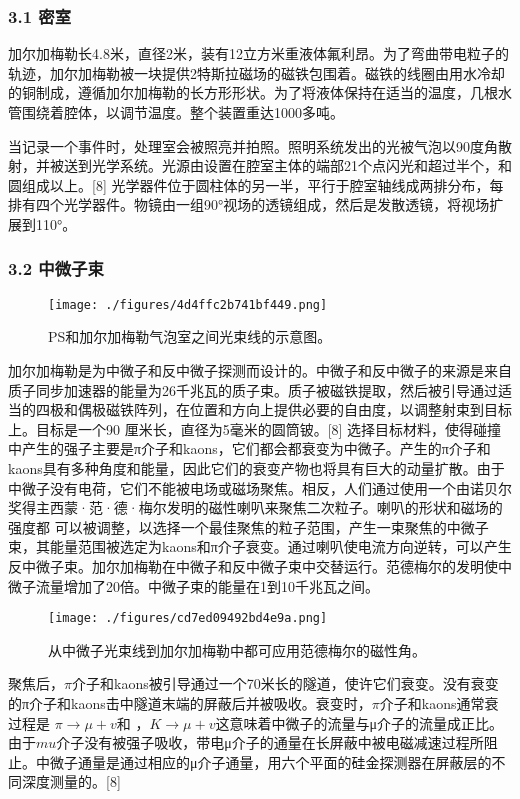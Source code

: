 \subsubsection{3.1 密室}
加尔加梅勒长4.8米，直径2米，装有12立方米重液体氟利昂。为了弯曲带电粒子的轨迹，加尔加梅勒被一块提供2特斯拉磁场的磁铁包围着。磁铁的线圈由用水冷却的铜制成，遵循加尔加梅勒的长方形形状。为了将液体保持在适当的温度，几根水管围绕着腔体，以调节温度。整个装置重达1000多吨。

当记录一个事件时，处理室会被照亮并拍照。照明系统发出的光被气泡以90度角散射，并被送到光学系统。光源由设置在腔室主体的端部21个点闪光和超过半个，和圆组成以上。[8] 光学器件位于圆柱体的另一半，平行于腔室轴线成两排分布，每排有四个光学器件。物镜由一组90°视场的透镜组成，然后是发散透镜，将视场扩展到110°。
\subsubsection{3.2 中微子束}
\begin{figure}[ht]
\centering
\texttt{[image: ./figures/4d4ffc2b741bf449.png]}
\caption{PS和加尔加梅勒气泡室之间光束线的示意图。} \label{fig_JRJML_4}
\end{figure}
加尔加梅勒是为中微子和反中微子探测而设计的。中微子和反中微子的来源是来自质子同步加速器的能量为26千兆瓦的质子束。质子被磁铁提取，然后被引导通过适当的四极和偶极磁铁阵列，在位置和方向上提供必要的自由度，以调整射束到目标上。目标是一个90 厘米长，直径为5毫米的圆筒铍。[8] 选择目标材料，使得碰撞中产生的强子主要是π介子和kaons，它们都会都衰变为中微子。产生的π介子和kaons具有多种角度和能量，因此它们的衰变产物也将具有巨大的动量扩散。由于中微子没有电荷，它们不能被电场或磁场聚焦。相反，人们通过使用一个由诺贝尔奖得主西蒙·范·德·梅尔发明的磁性喇叭来聚焦二次粒子。喇叭的形状和磁场的强度都 可以被调整，以选择一个最佳聚焦的粒子范围，产生一束聚焦的中微子束，其能量范围被选定为kaons和π介子衰变。通过喇叭使电流方向逆转，可以产生反中微子束。加尔加梅勒在中微子和反中微子束中交替运行。范德梅尔的发明使中微子流量增加了20倍。中微子束的能量在1到10千兆瓦之间。
\begin{figure}[ht]
\centering
\texttt{[image: ./figures/cd7ed09492bd4e9a.png]}
\caption{从中微子光束线到加尔加梅勒中都可应用范德梅尔的磁性角。} \label{fig_JRJML_5}
\end{figure}
聚焦后，$\pi$介子和kaons被引导通过一个70米长的隧道，使许它们衰变。没有衰变的π介子和kaons击中隧道末端的屏蔽后并被吸收。衰变时，$\pi$介子和kaons通常衰过程是 $\pi \to \mu + v$和 ，$K\to \mu + v$这意味着中微子的流量与μ介子的流量成正比。由于$mu$介子没有被强子吸收，带电μ介子的通量在长屏蔽中被电磁减速过程所阻止。中微子通量是通过相应的μ介子通量，用六个平面的硅金探测器在屏蔽层的不同深度测量的。[8]

